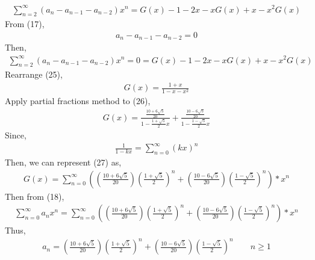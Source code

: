 \documentclass[12pt]{article}
\begin{document}
\begin{enumerate}
\begin{equation}
\begin{split}
\sum_{n=2}^{\infty} (a_{n}-a_{n-1}-a_{n-2})x^{n} =  G(x) -1 -2x-xG(x)+x -x^2G(x)
\end{split}
\end{equation}
From (17),
\begin{equation*}
\begin{split}
a_{n}-a_{n-1}-a_{n-2} = 0
\end{split}
\end{equation*}
Then,
\begin{equation}
\begin{split}
\sum_{n=2}^{\infty} (a_{n}-a_{n-1}-a_{n-2})x^{n} = 0 = G(x) -1 -2x-xG(x)+x -x^2G(x)
\end{split}
\end{equation}
Rearrange (25),
\begin{equation}
\begin{split}
G(x)= \frac{1+x}{1-x-x^2}
\end{split}
\end{equation}
Apply partial fractions method to (26),
\begin{equation}
\begin{split}
G(x) = \frac{\frac{10+6\sqrt{5}}{20}}{1-\frac{1+\sqrt{5}}{2}x} + \frac{\frac{10-6\sqrt{5}}{20}}{1-\frac{1-\sqrt{5}}{2}x}
\end{split}
\end{equation}
Since, 
\begin{equation*}
\begin{split}
\frac{1}{1-kx} = \sum_{n=0}^{\infty}{(kx)^n}
\end{split}
\end{equation*}
Then, we can represent (27) as,
\begin{equation*}
\begin{split}
G(x) = \sum_{n=0}^{\infty}{((\frac{10+6\sqrt{5}}{20})(\frac{1+\sqrt{5}}{2})^n+(\frac{10-6\sqrt{5}}{20})(\frac{1-\sqrt{5}}{2})^n)*x^n}
\end{split}
\end{equation*}
Then from (18),
\begin{equation*}
\begin{split}
\sum_{n=0}^{\infty} a_{n}x^{n} = \sum_{n=0}^{\infty}{((\frac{10+6\sqrt{5}}{20})(\frac{1+\sqrt{5}}{2})^n+(\frac{10-6\sqrt{5}}{20})(\frac{1-\sqrt{5}}{2})^n)*x^n}
\end{split}
\end{equation*}
Thus,
\begin{equation*}
\begin{split}
a_{n} = (\frac{10+6\sqrt{5}}{20})(\frac{1+\sqrt{5}}{2})^n+(\frac{10-6\sqrt{5}}{20})(\frac{1-\sqrt{5}}{2})^n \qquad n \geq 1
\end{split}
\end{equation*}


\end{enumerate}
\end{document}
